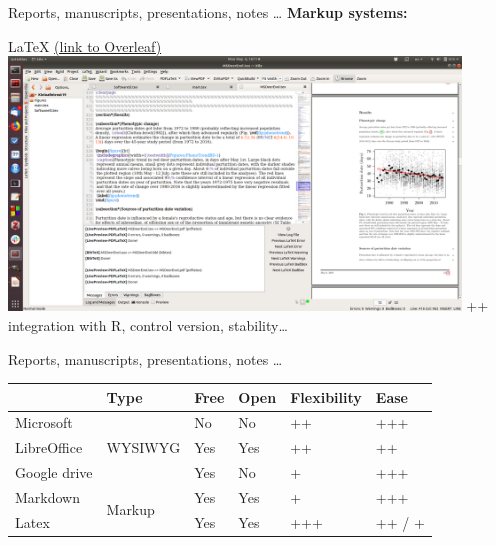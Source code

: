\documentclass[10pt]{beamer}%
\begin{document}
\begin{frame}{Reports, manuscripts, presentations, notes \dots}
\textbf{\Large Markup systems:}

    {    \centering \Large \alert{ \LaTeX }  \href{https://www.overleaf.com/project/5ccd41236221f76dfd324d84}{(link to Overleaf)} \\
        
        \includegraphics[width=0.9\textwidth]{Figures/latex}
    }
++ integration with R, control version, stability\dots 
\end{frame}

\begin{frame}{Reports, manuscripts, presentations, notes \dots}
\begin{center}
\begin{tabular}{llllll}
 &  Type & Free & Open &  Flexibility& Ease \\
 \hline
 Microsoft & \multirow{3}{*}{WYSIWYG} & No & No & ++ & +++\\
LibreOffice & & Yes & Yes & ++ &  ++\\
Google drive & & Yes & No & + &  +++\\
\cline{2-6}
Markdown & \multirow{2}{*}{Markup} &  Yes & Yes & +  & +++\\
Latex &  & Yes & Yes & +++ & ++ / +\\
\hline
\end{tabular}
\end{center}



\end{frame}
\end{document}
